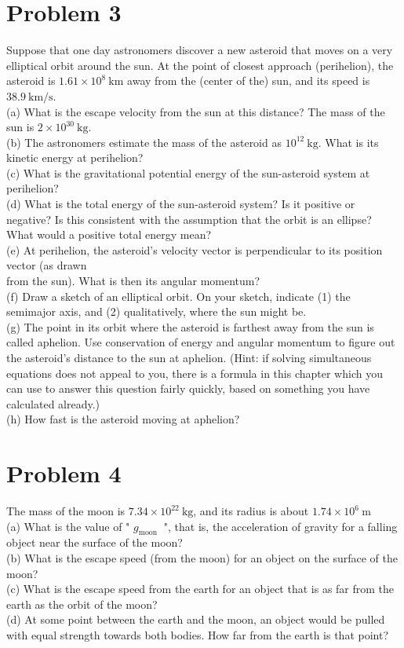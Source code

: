 \documentclass[10pt]{article}
\begin{document}
\section*{Problem 3}
Suppose that one day astronomers discover a new asteroid that moves on a very elliptical orbit around the sun. At the point of closest approach (perihelion), the asteroid is $1.61 \times 10^{8} \mathrm{~km}$ away from the (center of the) sun, and its speed is $38.9 \mathrm{~km} / \mathrm{s}$.\\
(a) What is the escape velocity from the sun at this distance? The mass of the sun is $2 \times 10^{30} \mathrm{~kg}$.\\
(b) The astronomers estimate the mass of the asteroid as $10^{12} \mathrm{~kg}$. What is its kinetic energy at perihelion?\\
(c) What is the gravitational potential energy of the sun-asteroid system at perihelion?\\
(d) What is the total energy of the sun-asteroid system? Is it positive or negative? Is this consistent with the assumption that the orbit is an ellipse? What would a positive total energy mean?\\
(e) At perihelion, the asteroid's velocity vector is perpendicular to its position vector (as drawn\\
from the sun). What is then its angular momentum?\\
(f) Draw a sketch of an elliptical orbit. On your sketch, indicate (1) the semimajor axis, and (2) qualitatively, where the sun might be.\\
(g) The point in its orbit where the asteroid is farthest away from the sun is called aphelion. Use conservation of energy and angular momentum to figure out the asteroid's distance to the sun at aphelion. (Hint: if solving simultaneous equations does not appeal to you, there is a formula in this chapter which you can use to answer this question fairly quickly, based on something you have calculated already.)\\
(h) How fast is the asteroid moving at aphelion?

\section*{Problem 4}
The mass of the moon is $7.34 \times 10^{22} \mathrm{~kg}$, and its radius is about $1.74 \times 10^{6} \mathrm{~m}$\\
(a) What is the value of " $g_{\text {moon }}$ ", that is, the acceleration of gravity for a falling object near the surface of the moon?\\
(b) What is the escape speed (from the moon) for an object on the surface of the moon?\\
(c) What is the escape speed from the earth for an object that is as far from the earth as the orbit of the moon?\\
(d) At some point between the earth and the moon, an object would be pulled with equal strength towards both bodies. How far from the earth is that point?
\end{document}
